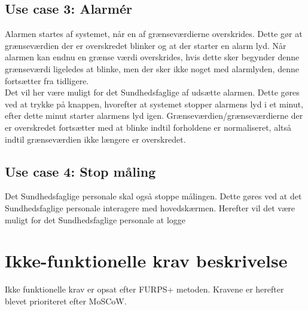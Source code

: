 \subsection{Use case 3: Alarmér}
Alarmen startes af systemet, når en af grænseværdierne overskrides. Dette gør at grænseværdien der er overskredet blinker og at der starter en alarm lyd. Når alarmen kan endnu en grænse værdi overskrides, hvis dette sker begynder denne grænseværdi ligeledes at blinke, men der sker ikke noget med alarmlyden, denne fortsætter fra tidligere. \\
Det vil her være muligt for det Sundhedsfaglige af udsætte alarmen. Dette gøres ved at trykke på knappen, hvorefter at systemet stopper alarmens lyd i et minut, efter dette minut starter alarmens lyd igen. Grænseværdien/grænseværdierne der er overskredet fortsætter med at blinke indtil forholdene er normaliseret, altså indtil grænseværdien ikke længere er overskredet.
\subsection{Use case 4: Stop måling}
Det Sundhedsfaglige personale skal også stoppe målingen. Dette gøres ved at det Sundhedsfaglige personale interagere med hovedskærmen. Herefter vil det være muligt for det Sundhedsfaglige personale at logge 
\section{Ikke-funktionelle krav beskrivelse}
Ikke funktionelle krav er opsat efter FURPS+ metoden. Kravene er herefter blevet prioriteret efter MoSCoW.
